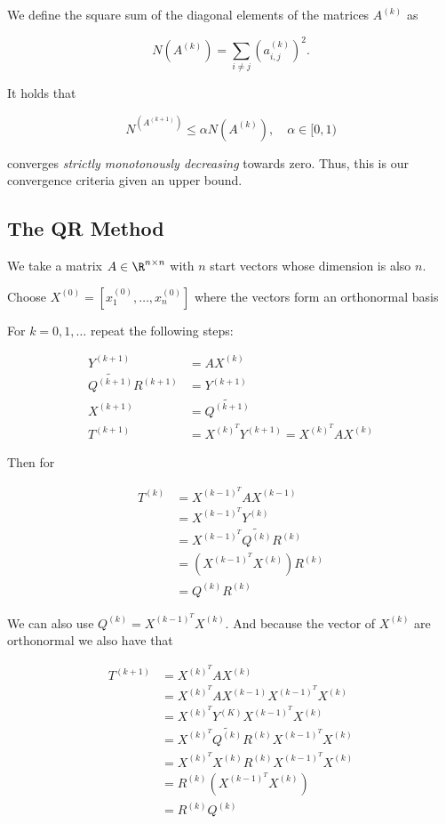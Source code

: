 We define the square sum of the diagonal elements of the matrices \(A^{(k)}\) as 

\[
    N(A^{(k)}) = \sum_{i \ne j} \left(a_{i,j}^{(k)}\right)^2.
\]

It holds that 

\[
    N^(A^{(k + 1)}) \le \alpha N(A^{(k)}), \quad \alpha \in [0, 1)
\]

converges \emph{strictly monotonously decreasing} towards zero. Thus, this is our convergence criteria 
given an upper bound.

\subsection{The QR Method}

We take a matrix \(A \in \R^{n \times n}\) with \(n\) start vectors whose dimension is also \(n\).

Choose \(X^{(0)} = [x_1^{(0)},\dots, x_n^{(0)}]\) where the vectors form an orthonormal basis

For \(k = 0, 1, \dots\) repeat the following steps:

\begin{align*}
    Y^{(k + 1)} &= AX^{(k)} \\ 
    \tilde{Q^{(k + 1)}} R^{(k + 1)} &= Y^{(k + 1)} \\ 
    X^{(k + 1)} &= \tilde{Q^{(k + 1)}} \\
    T^{(k + 1)} &= X^{(k)^T} Y^{(k + 1)} = X^{(k)^T} A X^{(k)}
\end{align*}

Then for 

\begin{align*} 
    T^{(k)} &= X^{(k - 1)^T} A X^{(k - 1)} \\ 
    &= X^{(k - 1)^T} Y^{(k)} \\ 
    &= X^{(k - 1)^T} \tilde{Q^{(k)}} R^{(k)}\\ 
    &= (X^{(k - 1)^T} X^{(k)}) R^{(k)} \\ 
    &= Q^{(k)} R^{(k)}
\end{align*}

We can also use \(Q^{(k)} = X^{(k - 1)^T} X^{(k)}\). And because the vector of \(X^{(k)}\) are orthonormal we also have that 

\begin{align*} 
    T^{(k + 1)} &= X^{(k)^T} A X^{(k)}\\
    &=  X^{(k)^T} A X^{(k - 1)} X^{(k - 1)^T} X^{(k)}\\
    &=  X^{(k)^T} Y^{(K)} X^{(k - 1)^T} X^{(k)}\\
    &=  X^{(k)^T} \tilde{Q^{(k)}} R^{(k)} X^{(k - 1)^T} X^{(k)}\\
    &=  X^{(k)^T} X^{(k)} R^{(k)} X^{(k - 1)^T} X^{(k)}\\
    &=  R^{(k)} (X^{(k - 1)^T} X^{(k)})\\
    &=  R^{(k)} Q^{(k)} 
\end{align*}

